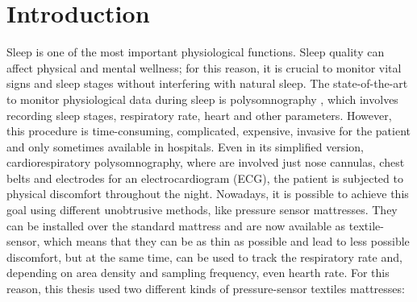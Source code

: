 
\chapter{Introduction}

\begin{comment}
l'intro ha una sua struttura, in 3 parti (sigh ho già scritto questa 
storia decine di volte, ma mai in generale per darla poi come lettura 
a chi deve fare l'intro per la prima volta): da 0.5 a 1 pagina di super-short-intro, 
questa parte non ho citazioni biblio, inizia con la stringa "scopo di questo lavoro è" 
e dice solo cosa è stato fatto. 
la seconda parte è quella corposa (massomeno da 2 
a 5 pagine) e "gronda citrazioni" e descrive cosa è stato fatto dando anche il contesto
(che ovviamente non ci sta in 0.5 - 1 pagina). la terza parte è la solita cavolata 
dell'indice in forma discorsiva (nel capitolo x si descrive questo e quello..., e così via)

\end{comment}


Sleep is one of the most important physiological functions. Sleep quality can affect physical 
and mental wellness; for this reason, it is crucial to monitor vital signs and sleep stages without interfering with natural sleep. 
The state-of-the-art to monitor physiological data during sleep is polysomnography \cite{Penzel2016ModulationsPolysomnography}, which involves recording sleep stages, respiratory rate, heart and other parameters. However, this procedure is time-consuming, complicated, expensive, invasive for the patient and only sometimes available in hospitals. Even in its simplified version, cardiorespiratory polysomnography, where are involved just nose cannulas, chest belts and electrodes for an electrocardiogram (ECG), the patient is subjected to physical discomfort throughout the night.
Nowadays, it is possible to achieve this goal using different unobtrusive methods, like pressure sensor mattresses.
They can be installed over the standard mattress and are now available as textile-sensor, which means that they can be as thin as possible and lead to less possible discomfort, but at the same time, can be used to track the respiratory rate and, depending on area density and sampling frequency, even hearth rate. For this reason, this thesis used two different kinds of pressure-sensor textiles mattresses:


